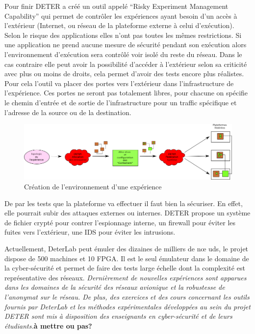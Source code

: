 Pour finir DETER a créé un outil appelé ``Risky Experiment Management
Capability'' qui permet de contrôler les expériences ayant besoin d'un
accès à l'extérieur (Internet, ou réseau de la plateforme externe à
celui d'exécution). Selon le risque des applications elles n'ont pas
toutes les mêmes restrictions. Si une application ne prend aucune
mesure de sécurité pendant son exécution alors l'environnement
d'exécution sera contrôlé voir isolé du reste du réseau. Dans le cas
contraire elle peut avoir la possibilité d'accéder à l'extérieur selon
sa criticité avec plus ou moins de droits, cela permet d'avoir des tests encore plus
réalistes. Pour cela l'outil va placer des portes vers l'extérieur
dans l'infrastructure de l'expérience. Ces portes ne seront pas
totalement libres, pour chacune on spécifie le chemin d'entrée et de
sortie de l'infrastructure pour un traffic spécifique et l'adresse de
la source ou de la destination.

\begin{figure}[H]
\centering
\includegraphics[scale=0.5]{Pictures/png/Deter_fonctionnement_general}
\caption{Création de l'environnement d'une expérience}
\label{Deter_fonc}
\end{figure}

De par les tests que la plateforme va effectuer il faut bien la
sécuriser. En effet, elle pourrait subir des attaques externes ou
internes. DETER propose un système de fichier crypté pour contrer
l'espionnage interne, un firewall pour éviter les fuites vers
l'extérieur, une IDS pour éviter les intrusions.

 Actuellement, DeterLab peut émuler des dizaines de milliers de n\oe
 uds, le projet dispose de 500 machines et 10 FPGA. Il est le seul
 émulateur dans le domaine de la cyber-sécurité et permet de faire des
 tests large échelle dont la complexité est représentative des
 réseaux. \textit{Dernièrement de nouvelles expériences sont apparues
   dans les domaines de la sécurité des réseaux avionique et la
   robustesse de l'anonymat sur le réseau. De plus, des exercices et
   des cours concernant les outils fournis par DeterLab et les
   méthodes expérimentales développées au sein du projet DETER sont
   mis à disposition des enseignants en cyber-sécurité et de leurs
   étudiants.}\textbf{à mettre ou pas?}
